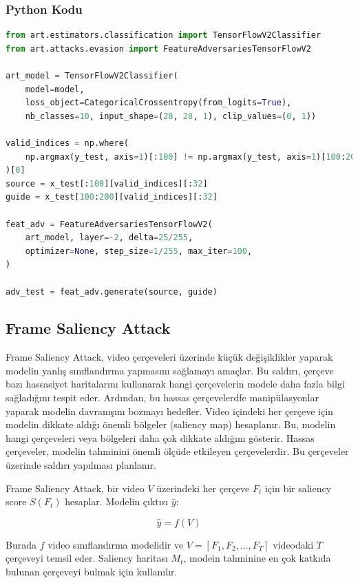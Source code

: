 \subsubsection{Python Kodu}

\begin{lstlisting}[language=Python]
from art.estimators.classification import TensorFlowV2Classifier
from art.attacks.evasion import FeatureAdversariesTensorFlowV2

art_model = TensorFlowV2Classifier(
    model=model, 
    loss_object=CategoricalCrossentropy(from_logits=True), 
    nb_classes=10, input_shape=(28, 28, 1), clip_values=(0, 1))

valid_indices = np.where(
    np.argmax(y_test, axis=1)[:100] != np.argmax(y_test, axis=1)[100:200]
)[0]
source = x_test[:100][valid_indices][:32]
guide = x_test[100:200][valid_indices][:32]

feat_adv = FeatureAdversariesTensorFlowV2(
    art_model, layer=-2, delta=25/255,
    optimizer=None, step_size=1/255, max_iter=100,
)

adv_test = feat_adv.generate(source, guide)
\end{lstlisting}

\newpage

\subsection{Frame Saliency Attack}

Frame Saliency Attack, video çerçeveleri üzerinde küçük değişiklikler yaparak modelin yanlış sınıflandırma yapmasını sağlamayı amaçlar. Bu saldırı, çerçeve bazı hassasiyet haritalarını kullanarak hangi çerçevelerin modele daha fazla bilgi sağladığını tespit eder. Ardından, bu hassas çerçevelerdfe manipülasyonlar yaparak modelin davranışını bozmayı hedefler. Video içindeki her çerçeve için modelin dikkate aldığı önemli bölgeler (saliency map) hesaplanır. Bu, modelin hangi çerçeveleri veya bölgeleri daha çok dikkate aldığını gösterir. Hassas çerçeveler, modelin tahminini önemli ölçüde etkileyen çerçevelerdir. Bu çerçeveler üzerinde saldırı yapılması planlanır.

Frame Saliency Attack, bir video $V$ üzerindeki her çerçeve $F_t$ için bir saliency score $S(F_t)$ hesaplar. Modelin çıktısı $\hat{y}$:

\[ \hat{y} = f(V) \]

Burada $f$ video sınıflandırma modelidir ve $V = [F_1, F_2, ..., F_T]$ videodaki $T$ çerçeveyi temsil eder. Saliency haritası $M_t$, modein tahminine en çok katkıda bulunan çerçeveyi bulmak için kullanılır.

